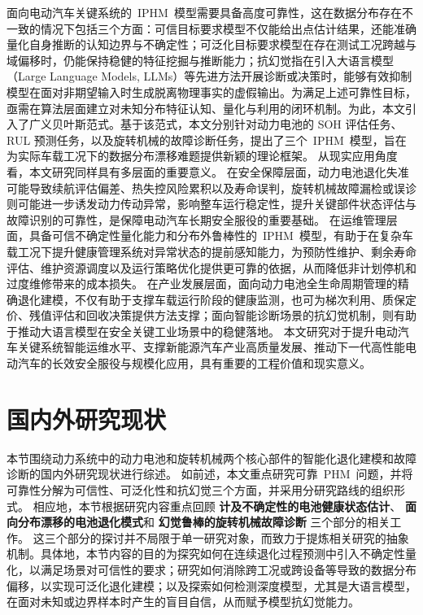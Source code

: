 面向电动汽车关键系统的~IPHM~模型需要具备高度可靠性，这在数据分布存在不一致的情况下包括三个方面：可信目标要求模型不仅能给出点估计结果，还能准确量化自身推断的认知边界与不确定性；可泛化目标要求模型在存在测试工况跨越与域偏移时，仍能保持稳健的特征挖掘与推断能力；抗幻觉指在引入大语言模型（Large Language Models, LLMs）等先进方法开展诊断或决策时，能够有效抑制模型在面对非期望输入时生成脱离物理事实的虚假输出。为满足上述可靠性目标，亟需在算法层面建立对未知分布特征认知、量化与利用的闭环机制。为此，本文引入了广义贝叶斯范式。基于该范式，本文分别针对动力电池的 SOH 评估任务、RUL 预测任务，以及旋转机械的故障诊断任务，提出了三个~IPHM~模型，旨在为实际车载工况下的数据分布漂移难题提供新颖的理论框架。
%
从现实应用角度看，本文研究同样具有多层面的重要意义。
% 
在安全保障层面，动力电池退化失准可能导致续航评估偏差、热失控风险累积以及寿命误判，旋转机械故障漏检或误诊则可能进一步诱发动力传动异常，影响整车运行稳定性，提升关键部件状态评估与故障识别的可靠性，是保障电动汽车长期安全服役的重要基础。
% 
在运维管理层面，具备可信不确定性量化能力和分布外鲁棒性的~IPHM~模型，有助于在复杂车载工况下提升健康管理系统对异常状态的提前感知能力，为预防性维护、剩余寿命评估、维护资源调度以及运行策略优化提供更可靠的依据，从而降低非计划停机和过度维修带来的成本损失。
% 
在产业发展层面，面向动力电池全生命周期管理的精确退化建模，不仅有助于支撑车载运行阶段的健康监测，也可为梯次利用、质保定价、残值评估和回收决策提供方法支撑；面向智能诊断场景的抗幻觉机制，则有助于推动大语言模型在安全关键工业场景中的稳健落地。
% 
本文研究对于提升电动汽车关键系统智能运维水平、支撑新能源汽车产业高质量发展、推动下一代高性能电动汽车的长效安全服役与规模化应用，具有重要的工程价值和现实意义。

\section{国内外研究现状}\label{sec:Intro_literature_review}

本节围绕动力系统中的动力电池和旋转机械两个核心部件的智能化退化建模和故障诊断的国内外研究现状进行综述。
% 
如前述，本文重点研究可靠~PHM~问题，并将可靠性分解为可信性、可泛化性和抗幻觉三个方面，并采用分研究路线的组织形式。
% 
相应地，本节根据研究内容重点回顾
\textbf{计及不确定性的电池健康状态估计}、
\textbf{面向分布漂移的电池退化模式}和
\textbf{幻觉鲁棒的旋转机械故障诊断}
三个部分的相关工作。
% 
这三个部分的探讨并不局限于单一研究对象，而致力于提炼相关研究的抽象机制。具体地，本节内容的目的为探究如何在连续退化过程预测中引入不确定性量化，以满足场景对可信性的要求；研究如何消除跨工况或跨设备等导致的数据分布偏移，以实现可泛化退化建模；以及探索如何检测深度模型，尤其是大语言模型，在面对未知或边界样本时产生的盲目自信，从而赋予模型抗幻觉能力。

